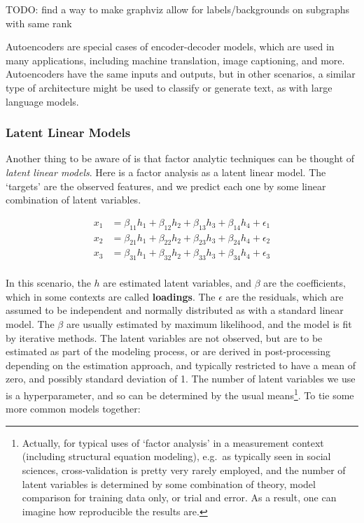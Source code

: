 \documentclass[
  letterpaper,
]{krantz}
\begin{document}
TODO: find a way to make graphviz allow for labels/backgrounds on
subgraphs with same rank

\begin{tcolorbox}[enhanced jigsaw, bottomrule=.15mm, rightrule=.15mm, colframe=quarto-callout-note-color-frame, colback=white, breakable, arc=.35mm, left=2mm, opacityback=0, leftrule=.75mm, toprule=.15mm]

Autoencoders are special cases of encoder-decoder models, which are used
in many applications, including machine translation, image captioning,
and more. Autoencoders have the same inputs and outputs, but in other
scenarios, a similar type of architecture might be used to classify or
generate text, as with large language models.

\end{tcolorbox}

\subsubsection{Latent Linear Models}\label{latent-linear-models}

Another thing to be aware of is that factor analytic techniques can be
thought of \emph{latent linear models}. Here is a factor analysis as a
latent linear model. The `targets' are the observed features, and we
predict each one by some linear combination of latent variables.

\[
\begin{aligned}
x_1 &= \beta_{11} h_1 + \beta_{12} h_2 + \beta_{13} h_3 + \beta_{14} h_4 + \epsilon_1 \\
x_2 &= \beta_{21} h_1 + \beta_{22} h_2 + \beta_{23} h_3 + \beta_{24} h_4 + \epsilon_2 \\
x_3 &= \beta_{31} h_1 + \beta_{32} h_2 + \beta_{33} h_3 + \beta_{34} h_4 + \epsilon_3 \\
\end{aligned}
\]

In this scenario, the \(h\) are estimated latent variables, and
\(\beta\) are the coefficients, which in some contexts are called
\textbf{loadings}. The \(\epsilon\) are the residuals, which are assumed
to be independent and normally distributed as with a standard linear
model. The \(\beta\) are usually estimated by maximum likelihood, and
the model is fit by iterative methods. The latent variables are not
observed, but are to be estimated as part of the modeling process, or
are derived in post-processing depending on the estimation approach, and
typically restricted to have a mean of zero, and possibly standard
deviation of 1. The number of latent variables we use is a
hyperparameter, and so can be determined by the usual means\footnote{Actually,
  for typical uses of `factor analysis' in a measurement context
  (including structural equation modeling), e.g.~as typically seen in
  social sciences, cross-validation is pretty very rarely employed, and
  the number of latent variables is determined by some combination of
  theory, model comparison for training data only, or trial and error.
  As a result, one can imagine how reproducible the results are.}. To
tie some more common models together:
\end{document}
